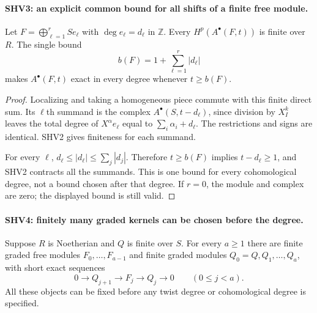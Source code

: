 \documentclass[11pt,a4paper]{article}
\numberwithin{equation}{section}
\theoremstyle{remark}\newtheorem{remark}[theorem]{Remark}
\begin{document}
\paragraph{SHV3: an explicit common bound for all shifts of a finite free module.}
\label{claim:SHV3}
Let $F=\bigoplus_{\ell=1}^r S e_\ell$ with $\deg e_\ell=d_\ell$
in $\mathbb Z$.  Every $H^p(A^\bullet(F,t))$ is finite over $R$.
The single bound
\[
                    b(F)=1+\sum_{\ell=1}^r|d_\ell|
                                                        \tag{SHV.8}
\]
makes $A^\bullet(F,t)$ exact in every degree whenever $t\ge b(F)$.

\begin{proof}
Localizing and taking a homogeneous piece commute with this finite
direct sum.  Its $\ell$th summand is the complex
$A^\bullet(S,t-d_\ell)$, since division by $X_I^k$ leaves the
total degree of $X^\alpha e_\ell$ equal to
$\sum_i\alpha_i+d_\ell$.  The restrictions and signs are identical.
SHV2 gives finiteness for each summand.

For every $\ell$,
$d_\ell\le|d_\ell|\le\sum_j|d_j|$.  Therefore
$t\ge b(F)$ implies $t-d_\ell\ge1$, and SHV2 contracts all the
summands.  This is one bound for every cohomological degree, not a
bound chosen after that degree.  If $r=0$, the module and complex
are zero; the displayed bound is still valid.
\end{proof}

\paragraph{SHV4: finitely many graded kernels can be chosen before the degree.}
\label{claim:SHV4}
Suppose $R$ is Noetherian and $Q$ is finite over $S$.
For every $a\ge1$ there are finite graded free modules
$F_0,\ldots,F_{a-1}$ and finite graded modules
$Q_0=Q,Q_1,\ldots,Q_a$, with short exact sequences
\[
 0\longrightarrow Q_{j+1}\longrightarrow F_j
       \longrightarrow Q_j\longrightarrow0
       \qquad(0\le j<a).                               \tag{SHV.9}
\]
All these objects can be fixed before any twist degree or
cohomological degree is specified.
\end{document}
